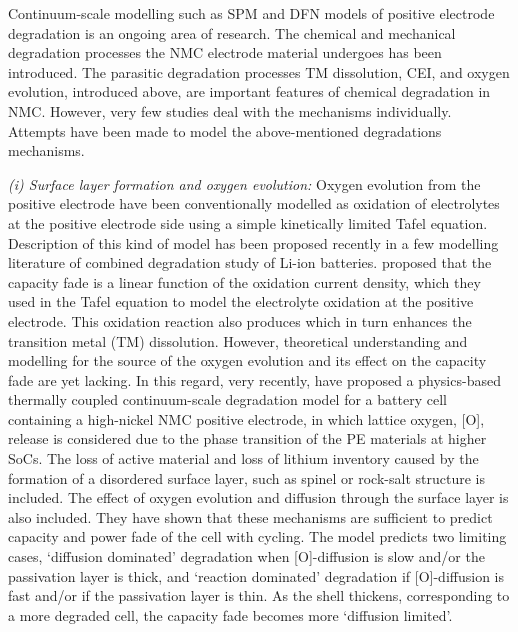 \documentclass[journal=jacsat,manuscript=article]{achemso}
\begin{document}
Continuum-scale modelling such as SPM \cite{reniers2019review,jana2019physical} and DFN models \cite{lin2013comprehensive} of positive electrode degradation is an ongoing area of research. The chemical and mechanical degradation processes the NMC electrode material undergoes has been introduced. The parasitic degradation processes TM dissolution, CEI, and oxygen evolution, introduced above, are important features of chemical degradation in NMC. However, very few studies deal with the mechanisms individually. Attempts have been made to model the above-mentioned degradations mechanisms.

\textit{(i) Surface layer formation and oxygen evolution:} Oxygen evolution from the positive electrode have been conventionally modelled as oxidation of electrolytes at the positive electrode side using a simple kinetically limited Tafel equation. Description of this kind of model has been proposed recently in a few modelling literature of combined degradation study of Li-ion batteries. \cite{lin2013comprehensive,reniers2019review} \citeauthor{jana2019physical} proposed that the capacity fade is a linear function of the oxidation current density, which they used in the Tafel equation to model the electrolyte oxidation at the positive electrode. \cite{jana2019physical} This oxidation reaction also produces  which in turn enhances the transition metal (TM) dissolution. However, theoretical understanding and modelling for the source of the oxygen evolution and its effect on the capacity fade are yet lacking. In this regard, very recently, \citeauthor{ghosh2020shrinking} have proposed a physics-based thermally coupled continuum-scale degradation model for a battery cell containing a high-nickel NMC positive electrode, in which lattice oxygen, [O], release is considered due to the phase transition of the PE materials at higher SoCs. \cite{ghosh2020shrinking} The loss of active material and loss of lithium inventory caused by the formation of a disordered surface layer, such as spinel or rock-salt structure is included. The effect of oxygen evolution and diffusion through the surface layer is also included. They have shown that these mechanisms are sufficient to predict capacity and power fade of the cell with cycling. The model predicts two limiting cases, `diffusion dominated' degradation when [O]-diffusion is slow and/or the passivation layer is thick, and `reaction dominated' degradation if [O]-diffusion is fast and/or if the passivation layer is thin. As the shell thickens, corresponding to a more degraded cell, the capacity fade becomes more `diffusion limited'.
\end{document}
